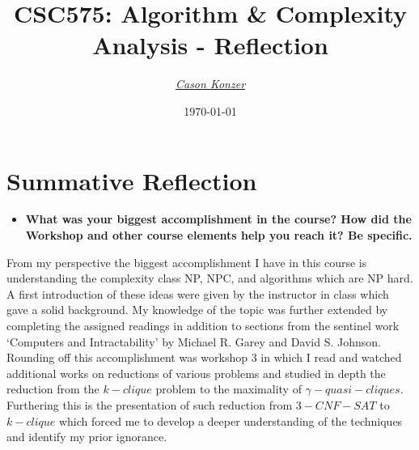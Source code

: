 \documentclass[12pt]{article}
\newcommand{\XB}{\color{black}}
\newcommand{\XV}{\color{violet}}
\begin{document}
\title{\textbf{CSC575}: Algorithm \& Complexity Analysis - Reflection}
\date{\today}
\author{\XV\textit{\large{\href{https://github.com/casonk}{Cason Konzer}}}\XB}

\maketitle
\hrulefill
\vfill 

\newpage

\section{Summative Reflection}
\begin{itemize}
    \item \textbf{What was your biggest accomplishment in the course? How did the Workshop and other course elements help you reach it? Be specific.}
\end{itemize}

From my perspective the biggest accomplishment I have in this course is understanding the complexity class NP, NPC, and algorithms which are NP hard. A first introduction of these ideas were given by the instructor in class which gave a solid background. My knowledge of the topic was further extended by completing the assigned readings in addition to sections from the sentinel work `Computers and Intractability' by Michael R. Garey and David S. Johnson. Rounding off this accomplishment was workshop 3 in which I read and watched additional works on reductions of various problems and studied in depth the reduction from the \(k-clique\) problem to the maximality of \(\gamma-quasi-cliques\). Furthering this is the presentation of such reduction from $3-CNF-SAT$ to $k-clique$ which forced me to develop a deeper understanding of the techniques and identify my prior ignorance. 
\end{document}
